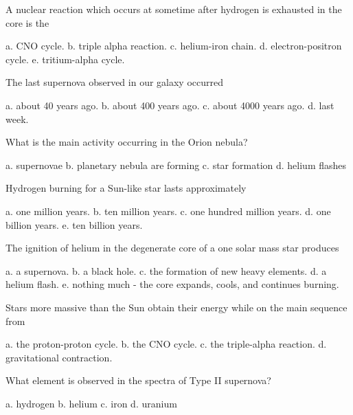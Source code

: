 




A nuclear reaction which occurs at sometime after hydrogen is exhausted in the core is the

a. CNO cycle.
b. triple alpha reaction.
c. helium-iron chain.
d. electron-positron cycle.
e. tritium-alpha cycle.

The last supernova observed in our galaxy occurred

a. about 40 years ago.
b. about 400 years ago.
c. about 4000 years ago.
d. last week.

What is the main activity occurring in the Orion nebula?

a. supernovae
b. planetary nebula are forming
c. star formation
d. helium flashes

Hydrogen burning for a Sun-like star lasts approximately

a. one million years.
b. ten million years.
c. one hundred million years.
d. one billion years.
e. ten billion years.

The ignition of helium in the degenerate core of a one solar mass star produces

a. a supernova.
b. a black hole.
c. the formation of new heavy elements.
d. a helium flash.
e. nothing much - the core expands, cools, and continues burning.

Stars more massive than the Sun obtain their energy while on the main sequence from

a. the proton-proton cycle.
b. the CNO cycle.
c. the triple-alpha reaction.
d. gravitational contraction.

What element is observed in the spectra of Type II supernova?

a. hydrogen
b. helium
c. iron
d. uranium


